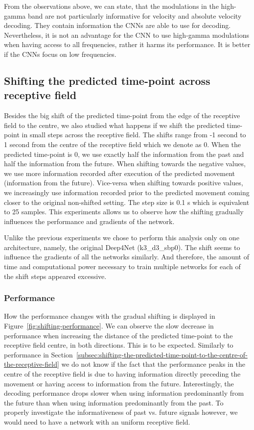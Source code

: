 From the observations above, we can state, that the modulations in the high-gamma band are not particularly informative for velocity and absolute velocity decoding.
They contain information the CNNs are able to use for decoding. 
Nevertheless, it is not an advantage for the CNN to use high-gamma modulations when having access to all frequencies, rather it harms its performance.
It is better if the CNNs focus on low frequencies.

\subsection{Shifting the predicted time-point across receptive field}\label{subsec:shifting-the-predicted-time-point-across-receptive-field}
Besides the big shift of the predicted time-point from the edge of the receptive field to the centre, we also studied what happens if we shift the predicted time-point in small steps across the receptive field. 
The shifts range from  -1 second  to 1 second from the centre of the receptive field which we denote as 0.
When the predicted time-point is 0, we use exactly half the information from the past and half the information from the future.
When shifting towards the negative values, we use more information recorded after execution of the predicted movement (information from the future). 
Vice-versa when shifting towards positive values, we increasingly use information recorded prior to the predicted movement coming closer to the original non-shifted setting.  
The step size is 0.1 s which is equivalent to 25 samples.
This experiments allows us to observe how the shifting gradually influences the performance and gradients of the network. 

Unlike the previous experiments we chose to perform this analysis only on one architecture, namely, the original Deep4Net (k3\_d3\_sbp0). 
The shift seems to influence the gradients of all the networks similarly.
And therefore, the amount of time and computational power necessary to train multiple networks for each of the shift steps appeared excessive.  

\subsubsection{Performance}\label{subsubsec:across-shiftig-performace}
How the performance changes with the gradual shifting is displayed in Figure~\ref{fig:shifting-performance}.
We can observe the slow decrease in performance when increasing the distance of the predicted time-point to the receptive field centre, in both directions. 
This is to be expected. 
Similarly to performance in Section~\ref{subsec:shifting-the-predicted-time-point-to-the-centre-of-the-receptive-field} we do not know if the fact that the performance peaks in the centre of the receptive field is due to having information directly preceding the movement or having access to information from the future. 
Interestingly, the decoding performance drops slower when using information predominantly from the future than when using information predominantly from the past.
To properly investigate the informativeness of past vs. future signals however, we would need to have a network with an uniform receptive field. 


